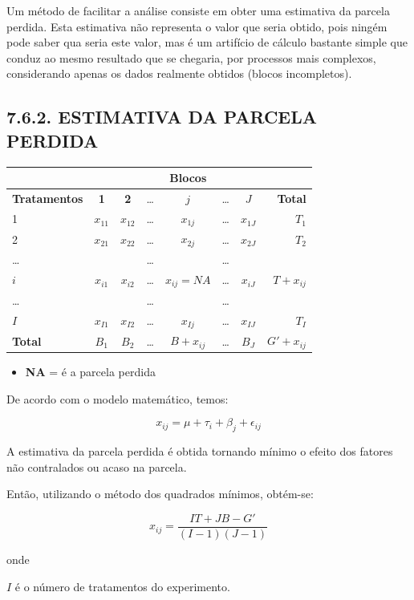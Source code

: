 \documentclass[
]{book}
\providecommand{\tightlist}{%
  \setlength{\itemsep}{0pt}\setlength{\parskip}{0pt}}
\begin{document}
Um método de facilitar a análise consiste em obter uma estimativa da parcela perdida. Esta estimativa não representa o valor que seria obtido, pois ningém pode saber qua seria este valor, mas é um artifício de cálculo bastante simple que conduz ao mesmo resultado que se chegaria, por processos mais complexos, considerando apenas os dados realmente obtidos (blocos incompletos).

\hypertarget{estimativa-da-parcela-perdida}{%
\subsection{7.6.2. ESTIMATIVA DA PARCELA PERDIDA}\label{estimativa-da-parcela-perdida}}

\begin{longtable}[]{@{}lccccccr@{}}
\toprule
& & & & Blocos & & &\tabularnewline
\midrule
\endhead
\textbf{Tratamentos} & \textbf{1} & \textbf{2} & \ldots{} & \(j\) & \ldots{} & \(J\) & \textbf{Total}\tabularnewline
1 & \(x_{11}\) & \(x_{12}\) & \ldots{} & \(x_{1j}\) & \ldots{} & \(x_{1J}\) & \(T_1\)\tabularnewline
2 & \(x_{21}\) & \(x_{22}\) & \ldots{} & \(x_{2j}\) & \ldots{} & \(x_{2J}\) & \(T_2\)\tabularnewline
\ldots{} & & & \ldots{} & & \ldots{} & &\tabularnewline
\(i\) & \(x_{i1}\) & \(x_{i2}\) & \ldots{} & \(x_{ij} = NA\) & \ldots{} & \(x_{iJ}\) & \(T+x_{ij}\)\tabularnewline
\ldots{} & & & \ldots{} & & \ldots{} & &\tabularnewline
\(I\) & \(x_{I1}\) & \(x_{I2}\) & \ldots{} & \(x_{Ij}\) & \ldots{} & \(x_{IJ}\) & \(T_I\)\tabularnewline
\textbf{Total} & \(B_1\) & \(B_2\) & \ldots{} & \(B+x_{ij}\) & \ldots{} & \(B_J\) & \(G'+x_{ij}\)\tabularnewline
\bottomrule
\end{longtable}

\begin{itemize}
\tightlist
\item
  \textbf{NA} = é a parcela perdida
\end{itemize}

De acordo com o modelo matemático, temos:

\[
x_{ij}= \mu+\tau_{i}+\beta_{j}+\epsilon_{ij}
\]

A estimativa da parcela perdida é obtida tornando mínimo o efeito dos fatores não contralados ou acaso na parcela.

Então, utilizando o método dos quadrados mínimos, obtém-se:

\[
x_{ij} = \frac{IT+JB-G'}{(I-1)(J-1)}
\]

onde

\(I\) é o número de tratamentos do experimento.
\end{document}
